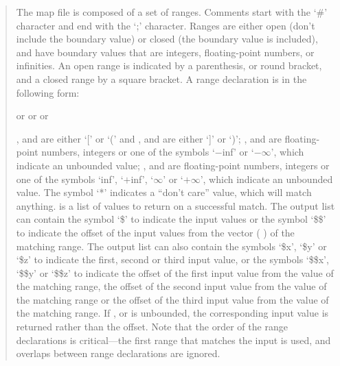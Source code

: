 \begin{quote}
The map file is composed of a set of ranges.
Comments start with the `\#' character and end with the `;' character.
Ranges are either open (don't include the boundary value) or closed (the boundary value is included),
and have boundary values that are integers, floating-point numbers, or infinities.
An open range is indicated by a parenthesis, or round bracket, and a closed range by a square bracket.
A range declaration is in the following form:

\centerline{ or   or   or }

,  and  are either `[' or `(' and ,  and  are
either `]' or `)';
,  and  are floating-point numbers, integers or one of the symbols `$-$inf' or
`$-\infty$', which indicate an unbounded value;
,  and  are floating-point numbers, integers or one of the symbols `inf', `$+$inf',
`$\infty$' or `$+\infty$', which indicate an unbounded value.
The symbol `*' indicates a ``don't care'' value, which will match anything.
 is a list of values to return on a successful match.
The output list can contain the symbol `\$' to indicate the input values or the symbol `\$\$' to
indicate the offset of the input values from the vector (  ) of the
matching range.
The output list can also contain the symbols `\$x', `\$y' or `\$z' to indicate the first, second or third
input value, or the symbols `\$\$x', `\$\$y' or `\$\$z' to indicate the offset of the first input value from
the  value of the matching range, the offset of the second input value from the  value
of the matching range or the offset of the third input value from the  value of the matching
range.
If ,  or  is unbounded, the corresponding input value is returned rather
than the offset.
Note that the order of the range declarations is critical---the first range that matches the input
is used, and overlaps between range declarations are ignored.
\end{quote}

\objItemMessage

\objItemComments

